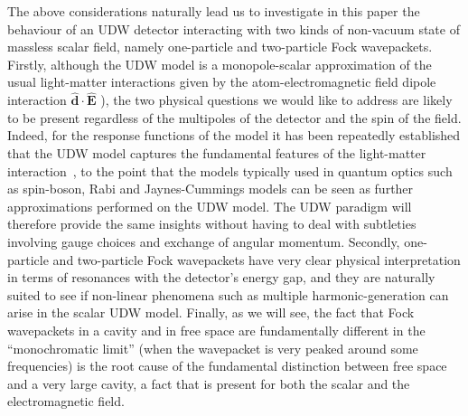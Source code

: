 \documentclass[prd,twocolumn,superscriptaddress,nofootinbib,floatfix,amsmath,amssymb]{revtex4-2}
\begin{document}
    The above considerations naturally lead us to investigate in this paper the behaviour of an UDW detector interacting with two kinds of non-vacuum state of massless scalar field, namely one-particle and two-particle Fock wavepackets. Firstly, although the UDW model is a monopole-scalar approximation of the usual light-matter interactions given by the atom-electromagnetic field dipole interaction $\hat{\bm{d}}\cdot\hat{\bm{E}}$ \cite{Lopp2021Rontgen}), the two physical questions we would like to address are likely to be present regardless of the multipoles of the detector and the spin of the field. Indeed, for the response functions of the model it has been repeatedly established that the UDW model captures the fundamental features of the light-matter interaction~\cite{Pablo2018rqo,Pozas2016}, to the point that the models typically used in quantum optics such as spin-boson, Rabi and Jaynes-Cummings models can be seen as further approximations performed on the UDW model. The UDW paradigm will therefore provide the same insights without having to deal with subtleties involving gauge choices and exchange of angular momentum. Secondly, one-particle and two-particle Fock wavepackets have very clear physical interpretation in terms of resonances with the detector's energy gap, and they are naturally suited to see if non-linear phenomena such as multiple harmonic-generation can arise in the scalar UDW model. Finally, as we will see, the fact that Fock wavepackets in a cavity and in free space are fundamentally different in the ``monochromatic limit'' (when the wavepacket is very peaked around some frequencies) is the root cause of the fundamental distinction between free space and a very large cavity, a fact that is present for both the scalar and the electromagnetic field.

    
   
\end{document}
